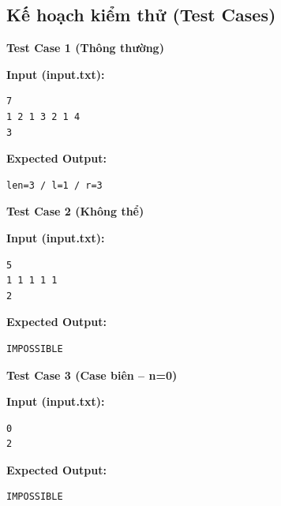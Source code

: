 \subsection{Kế hoạch kiểm thử (Test Cases)}

\textbf{Test Case 1 (Thông thường)}

\textbf{Input (input.txt):}
\begin{lstlisting}
7
1 2 1 3 2 1 4
3
\end{lstlisting}

\textbf{Expected Output:}
\begin{lstlisting}
len=3 / l=1 / r=3
\end{lstlisting}

\vspace{0.5cm}

\textbf{Test Case 2 (Không thể)}

\textbf{Input (input.txt):}
\begin{lstlisting}
5
1 1 1 1 1
2
\end{lstlisting}

\textbf{Expected Output:}
\begin{lstlisting}
IMPOSSIBLE
\end{lstlisting}

\vspace{0.5cm}

\textbf{Test Case 3 (Case biên -- n=0)}

\textbf{Input (input.txt):}
\begin{lstlisting}
0
2
\end{lstlisting}

\textbf{Expected Output:}
\begin{lstlisting}
IMPOSSIBLE
\end{lstlisting}